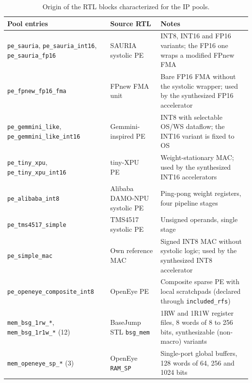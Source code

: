 \begin{table}[htbp]
\centering
\caption{Origin of the RTL blocks characterized for the IP pools.}
\label{tab:ip_pool_sources}
\footnotesize
\setlength{\tabcolsep}{4pt}
\renewcommand{\arraystretch}{1.15}
\begin{tabular}{@{}>{\raggedright\arraybackslash}p{4.4cm}>{\raggedright\arraybackslash}p{3.3cm}>{\raggedright\arraybackslash}p{6.0cm}@{}}
\hline
\textbf{Pool entries} & \textbf{Source RTL} & \textbf{Notes} \\
\hline
\texttt{pe\_sauria}, \texttt{pe\_sauria\_int16},
\texttt{pe\_sauria\_fp16} &
SAURIA systolic PE~\cite{sauria2023} &
INT8, INT16 and FP16 variants; the FP16 one wraps a modified FPnew
FMA \\
\texttt{pe\_fpnew\_fp16\_fma} &
FPnew FMA unit~\cite{fpnew,fpnew_repo} &
Bare FP16 FMA without the systolic wrapper; used by the synthesized
FP16 accelerator \\
\texttt{pe\_gemmini\_like},
\texttt{pe\_gemmini\_like\_int16} &
Gemmini-inspired PE~\cite{gemmini,gemmini_repo} &
INT8 with selectable OS/WS dataflow; the INT16 variant is fixed to OS \\
\texttt{pe\_tiny\_xpu}, \texttt{pe\_tiny\_xpu\_int16} &
tiny-XPU PE~\cite{tinyxpu} &
Weight-stationary MAC; used by the synthesized INT16 accelerators \\
\texttt{pe\_alibaba\_int8} &
Alibaba DAMO-NPU systolic PE~\cite{damo_npu} &
Ping-pong weight registers, four pipeline stages \\
\texttt{pe\_tms4517\_simple} &
TMS4517 systolic PE~\cite{tms4517_systolic} &
Unsigned operands, single stage \\
\texttt{pe\_simple\_mac} &
Own reference MAC &
Signed INT8 MAC without systolic logic; used by the synthesized INT8
accelerator \\
\texttt{pe\_openeye\_\allowbreak composite\_int8} &
OpenEye PE~\cite{openeye,openeye_repo} &
Composite sparse PE with local scratchpads (declared through
\texttt{included\_rfs}) \\
\texttt{mem\_bsg\_1rw\_*}, \texttt{mem\_bsg\_1r1w\_*} (12) &
BaseJump STL \texttt{bsg\_mem}~\cite{basejump_stl,basejump_stl_repo} &
1RW and 1R1W register files, 8 words of 8 to 256 bits, synthesizable
(non-macro) variants \\
\texttt{mem\_openeye\_sp\_*} (3) &
OpenEye \texttt{RAM\_SP}~\cite{openeye,openeye_repo} &
Single-port global buffers, 128 words of 64, 256 and 1024 bits \\
\hline
\end{tabular}
\end{table}

